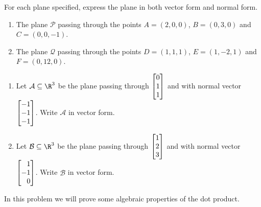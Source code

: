 \begin{exercises}
\begin{problist}
		\prob For each plane specified, express the plane in both vector form and normal form.
		\begin{enumerate}
			\item The plane $\mathcal P$ passing through the points
			$A=(2,0,0)$, $B=(0,3,0)$ and $C=(0,0,-1)$.
			\item The plane $\mathcal Q$ passing through the points
			$D=(1,1,1)$, $E=(1,-2,1)$ and $F=(0,12,0)$.
		\end{enumerate}

		\prob
		\begin{enumerate}
			\item Let $\mathcal A\subseteq \R^3$ be the plane passing through $\mat{0\\1\\1}$
			and with normal vector $\mat{-1\\-1\\-1}$. Write $\mathcal A$ in vector form.
			\item Let $\mathcal B\subseteq \R^3$ be the plane passing through $\mat{1\\2\\3}$
			and with normal vector $\mat{1\\-1\\0}$. Write $\mathcal B$ in vector form.
		\end{enumerate}

		\prob In this problem we will prove some algebraic properties of the dot product.
		\begin{enumerate}


\end{enumerate}
\end{problist}
\end{exercises}
